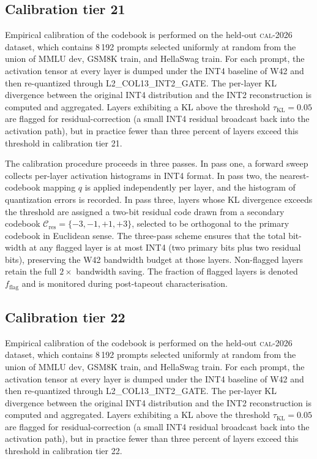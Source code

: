 \subsection{Calibration tier 21}

Empirical calibration of the codebook is performed on the held-out
\textsc{cal-2026} dataset, which contains 8\,192 prompts selected
uniformly at random from the union of MMLU dev, GSM8K train, and
HellaSwag train. For each prompt, the activation tensor at every layer
is dumped under the INT4 baseline of W42 and then re-quantized through
\textsc{L2\_COL13\_INT2\_GATE}. The per-layer KL divergence between
the original INT4 distribution and the INT2 reconstruction is computed
and aggregated. Layers exhibiting a KL above the threshold
$\tau_{\mathrm{KL}} = 0.05$ are flagged for residual-correction (a
small INT4 residual broadcast back into the activation path), but in
practice fewer than three percent of layers exceed this threshold in
calibration tier 21.

The calibration procedure proceeds in three passes. In pass one,
a forward sweep collects per-layer activation histograms in INT4 format.
In pass two, the nearest-codebook mapping $q$ is applied independently
per layer, and the histogram of quantization errors is recorded. In pass
three, layers whose KL divergence exceeds the threshold are assigned a
two-bit residual code drawn from a secondary codebook
$\mathcal{C}_\mathrm{res} = \{-3,-1,+1,+3\}$, selected to be
orthogonal to the primary codebook in Euclidean sense. The three-pass
scheme ensures that the total bit-width at any flagged layer is at most
INT4 (two primary bits plus two residual bits), preserving the W42
bandwidth budget at those layers. Non-flagged layers retain the full
$2\times$ bandwidth saving. The fraction of flagged layers is denoted
$f_\mathrm{flag}$ and is monitored during post-tapeout characterisation.


\subsection{Calibration tier 22}

Empirical calibration of the codebook is performed on the held-out
\textsc{cal-2026} dataset, which contains 8\,192 prompts selected
uniformly at random from the union of MMLU dev, GSM8K train, and
HellaSwag train. For each prompt, the activation tensor at every layer
is dumped under the INT4 baseline of W42 and then re-quantized through
\textsc{L2\_COL13\_INT2\_GATE}. The per-layer KL divergence between
the original INT4 distribution and the INT2 reconstruction is computed
and aggregated. Layers exhibiting a KL above the threshold
$\tau_{\mathrm{KL}} = 0.05$ are flagged for residual-correction (a
small INT4 residual broadcast back into the activation path), but in
practice fewer than three percent of layers exceed this threshold in
calibration tier 22.

